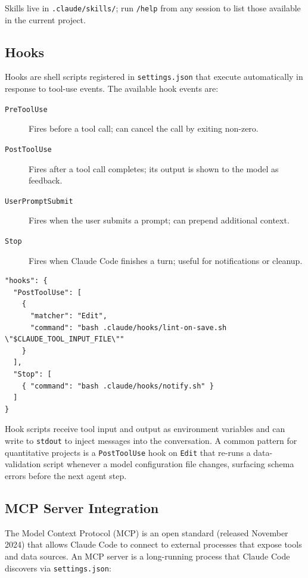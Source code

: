 Skills live in \texttt{.claude/skills/}; run \texttt{/help} from any session
to list those available in the current project.

\subsection{Hooks}
\label{app:claude-code:hooks}

Hooks are shell scripts registered in \texttt{settings.json} that execute
automatically in response to tool-use events.  The available hook events are:

\begin{description}
  \item[\texttt{PreToolUse}] Fires before a tool call; can cancel the call by
        exiting non-zero.
  \item[\texttt{PostToolUse}] Fires after a tool call completes; its output is
        shown to the model as feedback.
  \item[\texttt{UserPromptSubmit}] Fires when the user submits a prompt; can
        prepend additional context.
  \item[\texttt{Stop}] Fires when Claude Code finishes a turn; useful for
        notifications or cleanup.
\end{description}

\begin{verbatim}
"hooks": {
  "PostToolUse": [
    {
      "matcher": "Edit",
      "command": "bash .claude/hooks/lint-on-save.sh \"$CLAUDE_TOOL_INPUT_FILE\""
    }
  ],
  "Stop": [
    { "command": "bash .claude/hooks/notify.sh" }
  ]
}
\end{verbatim}

Hook scripts receive tool input and output as environment variables and can
write to \texttt{stdout} to inject messages into the conversation.  A common
pattern for quantitative projects is a \texttt{PostToolUse} hook on \texttt{Edit}
that re-runs a data-validation script whenever a model configuration file
changes, surfacing schema errors before the next agent step.

\subsection{MCP Server Integration}
\label{app:claude-code:mcp}

The Model Context Protocol (MCP) is an open standard (released November 2024)
\citep{anthropic2024mcp} that allows Claude Code to connect to external
processes that expose tools and data sources.  An MCP server is a long-running process that Claude Code discovers
via \texttt{settings.json}:

